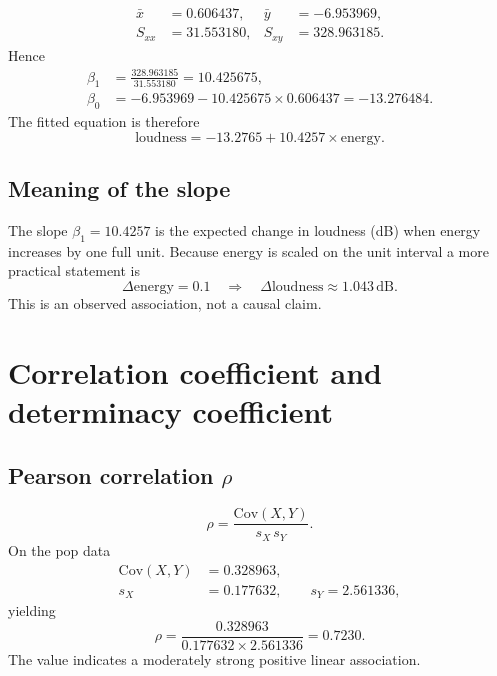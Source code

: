 \documentclass[11pt,a4paper]{article}
\begin{document}
\begin{align*}
  \bar{x} &= 0.606437, & \bar{y} &= -6.953969, \\
  S_{xx}  &= 31.553180, & S_{xy} &= 328.963185.
\end{align*}
Hence
\begin{align*}
  \beta_1 &= \frac{328.963185}{31.553180} = 10.425675, \\
  \beta_0 &= -6.953969 - 10.425675 \times 0.606437 = -13.276484.
\end{align*}
The fitted equation is therefore
\begin{equation}
  \boxed{\mathrm{loudness} = -13.2765 + 10.4257 \times \mathrm{energy}.}
\end{equation}

\subsection{Meaning of the slope}

The slope $\beta_1 = 10.4257$ is the expected change in loudness (dB) when
energy increases by one full unit. Because energy is scaled on the unit
interval a more practical statement is
\begin{equation}
  \Delta\mathrm{energy}=0.1 \quad\Rightarrow\quad
  \Delta\mathrm{loudness}\approx 1.043\,\mathrm{dB}.
\end{equation}
This is an observed association, not a causal claim.

\section{Correlation coefficient and determinacy coefficient}

\subsection{Pearson correlation \texorpdfstring{$\rho$}{rho}}

\begin{equation}
  \rho = \frac{\mathrm{Cov}(X,Y)}{s_X\,s_Y}.
\end{equation}
On the pop data
\begin{align*}
  \mathrm{Cov}(X,Y) &= 0.328963, \\
  s_X &= 0.177632, \qquad s_Y = 2.561336,
\end{align*}
yielding
\begin{equation}
  \rho = \frac{0.328963}{0.177632 \times 2.561336} = 0.7230 .
\end{equation}
The value indicates a moderately strong positive linear association.
\end{document}
